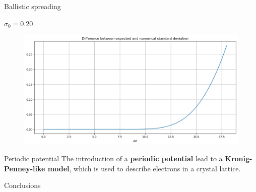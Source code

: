 \begin{frame}{Ballistic spreading}
{\begin{minipage}{0.31\textwidth}
\begin{figure}
        \end{figure}
    \end{minipage}
    \hfill
    \begin{minipage}{0.31\textwidth}
        \begin{center}
            $\sigma_0=0.20$
        \end{center}
        \vspace{-0.25cm}
        \begin{figure}
            \centering
            \includegraphics[width=\textwidth]{Immagini/plot-sigma-diff-2.png}
        \end{figure}
    \end{minipage}

    \vspace{-0.15cm}

    \begin{figure}[H]
        \centering
    \end{figure}}
\end{frame}

\begin{frame}{Periodic potential}
    The introduction of a \textbf{periodic potential} lead to a \textcolor{BrickRed}{\textbf{Kronig-Penney-like model}}, which is used to describe electrons in a crystal lattice.
\end{frame}

\begin{frame}{Conclusions}
    
\end{frame}